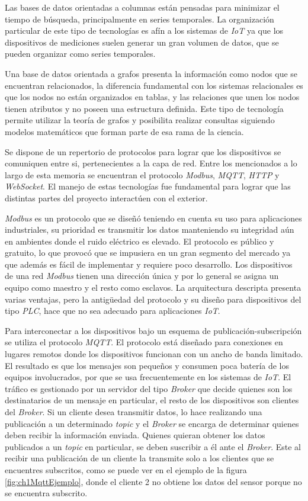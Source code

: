 Las bases de datos orientadas a columnas están pensadas para minimizar el tiempo de búsqueda, principalmente en series temporales.
La organización particular de este tipo de tecnologías es afín a los sistemas de \emph{IoT} ya que los dispositivos de mediciones suelen generar un gran volumen de datos, que se pueden organizar como series temporales.

Una base de datos orientada a grafos presenta la información como nodos que se encuentran relacionados, la diferencia fundamental con los sistemas relacionales es que los nodos no están organizados en tablas, y las relaciones que unen los nodos tienen atributos y no poseen una estructura definida.
Este tipo de tecnología permite utilizar la teoría de grafos y posibilita realizar consultas siguiendo modelos matemáticos que forman parte de esa rama de la ciencia.

Se dispone de un repertorio de protocolos para lograr que los dispositivos se comuniquen entre si, pertenecientes a la capa de red. Entre los mencionados a lo largo de esta memoria se encuentran el protocolo \emph{Modbus}, \emph{MQTT}, \emph{HTTP} y \emph{WebSocket}. El manejo de estas tecnologías fue fundamental para lograr que las distintas partes del proyecto interactúen con el exterior.

\emph{Modbus} es un protocolo que se diseñó teniendo en cuenta su uso para aplicaciones industriales, su prioridad es transmitir los datos manteniendo su integridad aún en ambientes donde el ruido eléctrico es elevado. El protocolo es público y gratuito, lo que provocó que se impusiera en un gran segmento del mercado ya que además es fácil de implementar y requiere poco desarrollo. Los dispositivos de una red \emph{Modbus} tienen una dirección única y por lo general se asigna un equipo como maestro y el resto como esclavos. La arquitectura descripta presenta varias ventajas, pero la antigüedad del protocolo y su diseño para dispositivos del tipo \emph{PLC}, hace que no sea adecuado para aplicaciones \emph{IoT}.

Para interconectar a los dispositivos bajo un esquema de publicación-subscripción se utiliza el protocolo \emph{MQTT}. El protocolo está diseñado para conexiones en lugares remotos donde los dispositivos funcionan con un ancho de banda limitado.
El resultado es que los mensajes son pequeños y consumen poca batería de los equipos involucrados, por que se usa frecuentemente en los sistemas de \emph{IoT}. El tráfico es gestionado por un servidor del tipo \emph{Broker} que decide quienes son los destinatarios de un mensaje en particular, el resto de los dispositivos son clientes del \emph{Broker}.
Si un cliente desea transmitir datos, lo hace realizando una publicación a un determinado \emph{topic} y el \emph{Broker} se encarga de determinar quienes deben recibir la información enviada.
Quienes quieran obtener los datos publicados a un \emph{topic} en particular, se deben suscribir a él ante el \emph{Broker}.
Este al recibir una publicación de un cliente la transmite solo a los clientes que se encuentres subscritos, como se puede ver en el ejemplo de la figura \ref{fig:ch1MqttEjemplo}, donde el cliente 2 no obtiene los datos del sensor porque no se encuentra subscrito.

